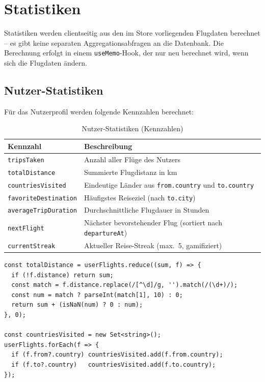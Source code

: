\section{Statistiken}

Statistiken werden clientseitig aus den im Store vorliegenden Flugdaten berechnet --
es gibt keine separaten Aggregationsabfragen an die Datenbank. Die Berechnung
erfolgt in einem \texttt{useMemo}-Hook, der nur neu berechnet wird, wenn sich die
Flugdaten ändern.

\subsection{Nutzer-Statistiken}

Für das Nutzerprofil werden folgende Kennzahlen berechnet:

\begin{table}[H]
  \centering
  \caption{Nutzer-Statistiken (Kennzahlen)}
  \label{tab:user_stats}
  \begin{tabular}{p{4cm}p{9cm}}
  \toprule
  \textbf{Kennzahl} & \textbf{Beschreibung} \\
  \midrule
  \texttt{tripsTaken} & Anzahl aller Flüge des Nutzers \\
  \texttt{totalDistance} & Summierte Flugdistanz in km \\
  \texttt{countriesVisited} & Eindeutige Länder aus \texttt{from.country} und \texttt{to.country} \\
  \texttt{favoriteDestination} & Häufigstes Reiseziel (nach \texttt{to.city}) \\
  \texttt{averageTripDuration} & Durchschnittliche Flugdauer in Stunden \\
  \texttt{nextFlight} & Nächster bevorstehender Flug (sortiert nach \texttt{departureAt}) \\
  \texttt{currentStreak} & Aktueller Reise-Streak (max.\ 5, gamifiziert) \\
  \bottomrule
  \end{tabular}
\end{table}

\begin{lstlisting}[style=skyline-ts,caption={Berechnung totalDistance und countriesVisited (Auszug profile.tsx)},label={lst:user_stats_code}]
const totalDistance = userFlights.reduce((sum, f) => {
  if (!f.distance) return sum;
  const match = f.distance.replace(/[^\d]/g, '').match(/(\d+)/);
  const num = match ? parseInt(match[1], 10) : 0;
  return sum + (isNaN(num) ? 0 : num);
}, 0);

const countriesVisited = new Set<string>();
userFlights.forEach(f => {
  if (f.from?.country) countriesVisited.add(f.from.country);
  if (f.to?.country)   countriesVisited.add(f.to.country);
});
\end{lstlisting}

